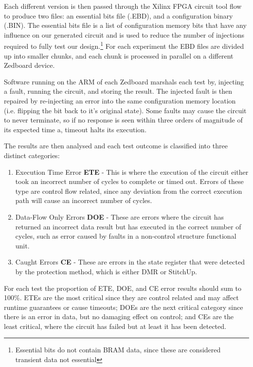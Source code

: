 Each different version is then passed through the Xilinx FPGA circuit tool flow to produce
two files: an essential bits file (.EBD), and a configuration binary (.BIN).
The essential bits file is a list of configuration memory bits that have any
influence on our generated circuit and is used to reduce the number of injections
required to fully test our design.\footnote{Essential bits do not contain BRAM data,
since these are considered transient data not essential}
For each experiment the EBD files are divided up into smaller chunks, and each chunk is
processed in parallel on a different Zedboard device.

Software running on the ARM of each Zedboard marshals each test by, injecting a fault,
running the circuit, and storing the result.
The injected fault is then repaired by re-injecting an error into the
same configuration memory location (i.e. flipping the bit back to it's original state).
Some faults may cause the circuit to never terminate, so if no response is seen within three orders
of magnitude of its expected time a, timeout halts its execution.

The results are then analysed and each test outcome is classified into three distinct categories:

\begin{enumerate}
\setlength{\itemsep}{1pt}
\setlength{\parskip}{0pt}
\setlength{\parsep}{0pt}
\item Execution Time Error \textbf{ETE} - This is where the execution of the circuit either took
an incorrect number of cycles to complete or timed out. Errors of these type are
control flow related, since any deviation from the correct execution path will cause
an incorrect number of cycles.
\item Data-Flow Only Errors \textbf{DOE} - These are errors where the circuit has returned an incorrect
data result but has executed in the correct number of cycles, such as error caused
by faults in a non-control structure functional unit.
\item Caught Errors \textbf{CE} - These are errors in the state register that were detected by the protection method, which is
either DMR or StitchUp.
\end{enumerate}

For each test the proportion of ETE, DOE, and CE error results should sum to 100\%.
ETEs are the most critical since they are control related and may affect runtime guarantees or cause timeouts;
DOEs are the next critical category since there is an error in data, but no damaging effect on control;
and CEs are the least critical, where the circuit has failed but at least it has been detected.
